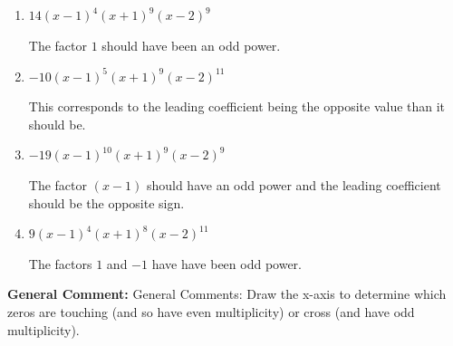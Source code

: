 \documentclass{extbook}[14pt]
\begin{document}
\begin{enumerate}
{\begin{enumerate}[label=\Alph*.]
* This is the correct option.
\item \( 14(x - 1)^{4} (x + 1)^{9} (x - 2)^{9} \)

The factor $1$ should have been an odd power.
\item \( -10(x - 1)^{5} (x + 1)^{9} (x - 2)^{11} \)

This corresponds to the leading coefficient being the opposite value than it should be.
\item \( -19(x - 1)^{10} (x + 1)^{9} (x - 2)^{9} \)

The factor $(x - 1)$ should have an odd power and the leading coefficient should be the opposite sign.
\item \( 9(x - 1)^{4} (x + 1)^{8} (x - 2)^{11} \)

The factors $1$ and $-1$ have have been odd power.
\end{enumerate}

\textbf{General Comment:} General Comments: Draw the x-axis to determine which zeros are touching (and so have even multiplicity) or cross (and have odd multiplicity).
}
\end{enumerate}
\end{document}
